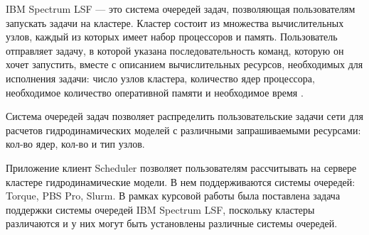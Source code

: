 

IBM Spectrum LSF --- это система очередей задач, позволяющая пользователям запускать задачи на кластере. Кластер состоит из множества вычислительных узлов, каждый из которых имеет набор процессоров и память. Пользователь отправляет задачу, в которой указана последовательность команд, которую он хочет запустить, вместе с описанием вычислительных ресурсов, необходимых для исполнения задачи: число узлов кластера, количество ядер процессора, необходимое количество оперативной памяти и необходимое время \cite{hpc-llnl}.

Система очередей задач позволяет распределить пользовательские задачи сети для расчетов гидродинамических моделей с различными запрашиваемыми ресурсами: кол-во ядер, кол-во и тип узлов.

Приложение клиент Scheduler позволяет пользователям рассчитывать на сервере кластере гидродинамические модели. В нем поддерживаются системы очередей: Torque, PBS Pro, Slurm. В рамках курсовой работы была поставлена задача поддержки системы очередей IBM Spectrum LSF, поскольку кластеры различаются и у них могут быть установлены различные системы очередей.

\clearpage

